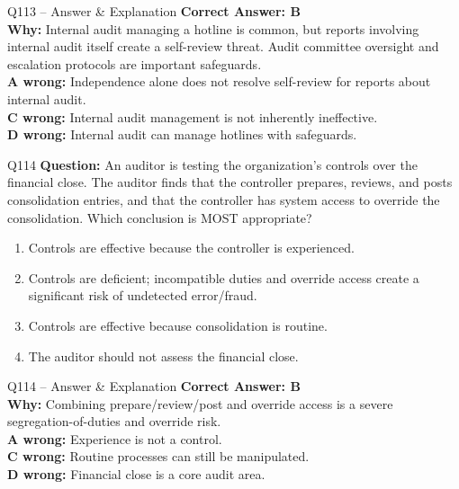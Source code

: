 \documentclass[aspectratio=169,10pt]{beamer}
\begin{document}
	\begin{frame}[t]{Q113 -- Answer \& Explanation}
		\small
		\textbf{Correct Answer: B} \\[4pt]
		\textbf{Why:} Internal audit managing a hotline is common, but reports involving internal audit itself create a self-review threat. Audit committee oversight and escalation protocols are important safeguards. \\[4pt]
		\textbf{A wrong:} Independence alone does not resolve self-review for reports about internal audit. \\[2pt]
		\textbf{C wrong:} Internal audit management is not inherently ineffective. \\[2pt]
		\textbf{D wrong:} Internal audit can manage hotlines with safeguards.
	\end{frame}
	
	\begin{frame}[t]{Q114}
		\small
		\textbf{Question:} An auditor is testing the organization's controls over the financial close. The auditor finds that the controller prepares, reviews, and posts consolidation entries, and that the controller has system access to override the consolidation. Which conclusion is MOST appropriate?
		\begin{enumerate}[label=\Alph*.,itemsep=1pt,topsep=2pt]
			\item Controls are effective because the controller is experienced.
			\item Controls are deficient; incompatible duties and override access create a significant risk of undetected error/fraud.
			\item Controls are effective because consolidation is routine.
			\item The auditor should not assess the financial close.
		\end{enumerate}
	\end{frame}
	
	\begin{frame}[t]{Q114 -- Answer \& Explanation}
		\small
		\textbf{Correct Answer: B} \\[4pt]
		\textbf{Why:} Combining prepare/review/post and override access is a severe segregation-of-duties and override risk. \\[4pt]
		\textbf{A wrong:} Experience is not a control. \\[2pt]
		\textbf{C wrong:} Routine processes can still be manipulated. \\[2pt]
		\textbf{D wrong:} Financial close is a core audit area.
	\end{frame}
	
\end{document}
